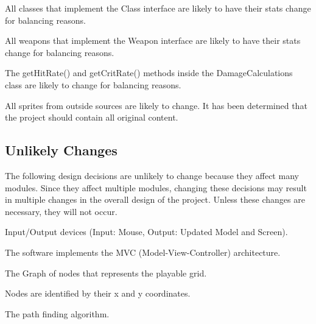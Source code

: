 \documentclass{article}
\newcounter{acnum}
\newcommand{\actheacnum}{AC\theacnum}
\newcounter{ucnum}
\newcommand{\uctheucnum}{UC\theucnum}
\begin{document}
\begin{description}[leftmargin=1.2cm]
    \item[\refstepcounter{acnum} \actheacnum \label{acClass}:] All classes that implement the Class interface are likely to have their stats change for balancing reasons.
    \item[\refstepcounter{acnum} \actheacnum \label{acWeapon}:] All weapons that implement the Weapon interface are likely to have their stats change for balancing reasons.
    \item[\refstepcounter{acnum} \actheacnum \label{acDamageCalculations}:] The getHitRate() and getCritRate() methods inside the DamageCalculations class are likely to change for balancing reasons.
    \item[\refstepcounter{acnum} \actheacnum \label{acSprites}:] All sprites from outside sources are likely to change. It has been determined that the project should contain all original content.
\end{description}

\subsection{Unlikely Changes} \label{SecUchange}
The following design decisions are unlikely to change because they affect many modules. Since they affect multiple modules, changing these decisions may result in multiple changes in the overall design of the project. Unless these changes are necessary, they will not occur.

\begin{description}[leftmargin=1.2cm]
    \item[\refstepcounter{ucnum} \uctheucnum \label{ucIO}:] Input/Output devices
      (Input: Mouse, Output: Updated Model and Screen).
    \item[\refstepcounter{ucnum} \uctheucnum \label{ucArchitecture}:] The software implements the MVC (Model-View-Controller) architecture.
    \item[\refstepcounter{ucnum} \uctheucnum \label{ucGraph}:] The Graph of nodes that represents the playable grid.
    \item[\refstepcounter{ucnum} \uctheucnum \label{ucNodeIdentification}:] Nodes are identified by their x and y coordinates.
    \item[\refstepcounter{ucnum} \uctheucnum \label{ucPathfinder}:] The path finding algorithm.
\end{description}

\end{document}

